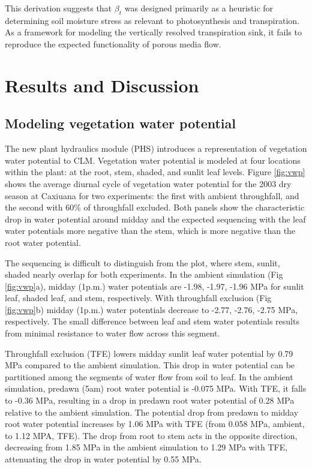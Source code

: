 \documentclass[draft,linenumbers]{agujournal}
\begin{document}
    This derivation suggests that $\beta_t$ was designed primarily as a heuristic for determining soil moisture stress
    as relevant to photosynthesis and transpiration.
    As a framework for modeling the vertically resolved transpiration sink, 
    it fails to reproduce the expected functionality of porous media flow.
    
     
    
\section{Results and Discussion}
\subsection{Modeling vegetation water potential}

The new plant hydraulics module (PHS) introduces a representation of vegetation water potential to CLM.
Vegetation water potential is modeled at four locations within the plant: at the root, stem, shaded, and sunlit leaf levels.
Figure \ref{fig:vwp} shows the average diurnal cycle of vegetation water potential for the 2003 dry season at Caxiuana for two experiments:
the first with ambient throughfall, and the second with 60\% of throughfall excluded. 
Both panels show the characteristic drop in water potential around midday and the expected sequencing with 
the leaf water potentials more negative than the stem, which is more negative than the root water potential.

The sequencing is difficult to distinguish from the plot, where stem, sunlit, shaded nearly overlap for both experiments. 
In the ambient simulation (Fig \ref{fig:vwp}a), midday (1p.m.) water potentials are -1.98, -1.97, -1.96 MPa 
for sunlit leaf, shaded leaf, and stem, respectively.
With throughfall exclusion (Fig \ref{fig:vwp}b) midday (1p.m.) water potentials decrease to -2.77, -2.76, -2.75 MPa, respectively.
The small difference between leaf and stem water potentials results from minimal resistance to water flow across this segment. 

Throughfall exclusion (TFE) lowers midday sunlit leaf water potential by 0.79 MPa compared to the ambient simulation.
This drop in water potential can be partitioned among the segments of water flow from soil to leaf.
In the ambient simulation, predawn (5am) root water potential is -0.075 MPa. 
With TFE, it falls to -0.36 MPa, resulting in a drop in predawn root water potential of 0.28 MPa relative to the ambient simulation. 
The potential drop from predawn to midday root water potential increases by 1.06 MPa with TFE 
(from 0.058 MPa, ambient, to 1.12 MPA, TFE).
The drop from root to stem acts in the opposite direction, decreasing from 1.85 MPa in the ambient simulation
to 1.29 MPa with TFE, attenuating the drop in water potential by 0.55 MPa.
\end{document}
